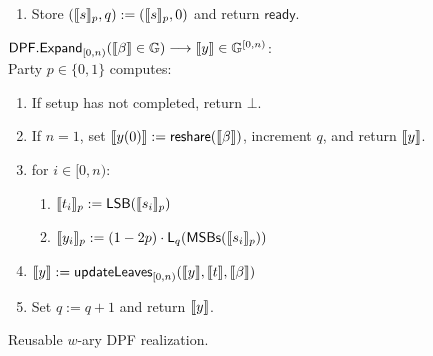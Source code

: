 \begin{figure}[H]
{\begin{minipage}{.95\textwidth}
\begin{enumerate}
\begin{enumerate}
            \item If $d=1$, process only the first $n$ entries of $\share u$.
            For entry $i\in[0,n)$, with child number $j:=1+(i\bmod w)$
            and seed/tag pair $(\share s,\share{t'})$:
            \begin{enumerate}
                \item $\share{s}:=\share{s} \oplus\share{t'} \cdot \sigma_{j}$ 
                \item $\share{s_i}:=\share{s}$
            \end{enumerate}
            \item $\share u:=\share{u'}$
            \item $\share{u'}:=()$
        \end{enumerate}

        \item Store $(\share s_p,q):=(\share s_p,0)$ and return $\mathsf{ready}$.
    \end{enumerate}

    \vspace{\smallskipamount}
    \noindent
    $\mathsf{DPF.Expand}_{[0,n)}(\share\beta\in\mathbb G)
    \longrightarrow\share y\in\mathbb G^{[0,n)}$:\\[0.3em]
    Party $p\in\{0,1\}$ computes:
    \begin{enumerate}
        \item If setup has not completed, return $\bot$.
        \item If $n=1$, set $\share{y(0)}:=\mathsf{reshare}(\share\beta)$,
        increment $q$, and return $\share y$.
        \item for $i\in[0,n)$:
        \begin{enumerate}
            \item $\share{t_i}_p:=\lsb(\share{s_i}_p)$
            \item $\share{y_i}_p:=(1-2p)\cdot
            \mathsf{L}_q(\msbs(\share{s_i}_p))$
        \end{enumerate}
        \item $\share y:=\updateLeave_{[0,n)}(\share y,\share t,\share\beta)$
        \item Set $q:=q+1$ and return $\share y$.
    \end{enumerate}
    \end{minipage}}
\caption{%
  Reusable $w$-ary DPF realization.\label{fig:Dpf}
}
\end{figure}

